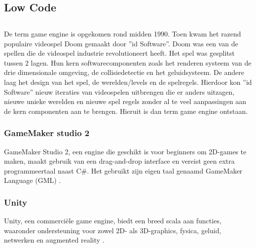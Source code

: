 \chapter{}%
\label{ch:stand-van-zaken}


\section{Low Code}


\section{}%
\label{sec:game-engines}
De term game engine is opgekomen rond midden 1990. Toen kwam het razend populaire videospel Doom gemaakt door ”id Software”. Doom was een van de spellen die de videospel industrie revolutioneert heeft. Het spel was gesplitst tussen 2 lagen. Hun kern softwarecomponenten zoals het renderen systeem van de drie dimensionale omgeving, de collisiedetectie en het geluidsysteem. De andere laag het design van het spel, de werelden/levels en de spelregels. Hierdoor kon ”id Software” nieuw iteraties van videospelen uitbrengen die er anders uitzagen, nieuwe unieke werelden en nieuwe spel regels zonder al te veel aanpassingen aan de kern componenten aan te brengen. Hieruit is dan term game engine ontstaan. \cite{gregory2018game}

\subsection{GameMaker studio 2}
GameMaker Studio 2, een engine die geschikt is voor beginners om 2D-games te maken, maakt gebruik van een drag-and-drop interface en vereist geen extra programmeertaal naast C\#. Het gebruikt zijn eigen taal genaamd GameMaker Language (GML) \autocite{cossu2019game}.

\subsection{Unity}
Unity, een commerciële game engine, biedt een breed scala aan functies, waaronder ondersteuning voor zowel 2D- als 3D-graphics, fysica, geluid, netwerken en augmented reality \autocite{Haas2014}.
